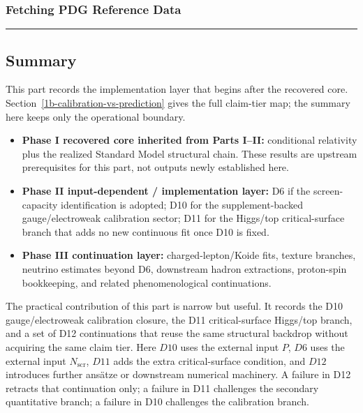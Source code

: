 \subsubsection{Fetching PDG Reference Data}\label{125-fetching-pdg-reference-data}

\begin{Shaded}
\begin{Highlighting}[]
\end{Highlighting}
\end{Shaded}

\begin{center}\rule{0.5\linewidth}{0.5pt}\end{center}

\subsection{Summary}\label{summary}

This part records the implementation layer that begins after the recovered core. Section~\ref{1b-calibration-vs-prediction} gives the full claim-tier map; the summary here keeps only the operational boundary.

\begin{itemize}
\item \textbf{Phase I recovered core inherited from Parts I--II:} conditional relativity plus the realized Standard Model structural chain. These results are upstream prerequisites for this part, not outputs newly established here.
\item \textbf{Phase II input-dependent / implementation layer:} D6 if the screen-capacity identification is adopted; D10 for the supplement-backed gauge/electroweak calibration sector; D11 for the Higgs/top critical-surface branch that adds no new continuous fit once D10 is fixed.
\item \textbf{Phase III continuation layer:} charged-lepton/Koide fits, texture branches, neutrino estimates beyond D6, downstream hadron extractions, proton-spin bookkeeping, and related phenomenological continuations.
\end{itemize}

The practical contribution of this part is narrow but useful. It records the D10 gauge/electroweak calibration closure, the D11 critical-surface Higgs/top branch, and a set of D12 continuations that reuse the same structural backdrop without acquiring the same claim tier. Here \(D10\) uses the external input \(P\), \(D6\) uses the external input \(N_{\mathrm{scr}}\), \(D11\) adds the extra critical-surface condition, and \(D12\) introduces further ans\"atze or downstream numerical machinery. A failure in D12 retracts that continuation only; a failure in D11 challenges the secondary quantitative branch; a failure in D10 challenges the calibration branch.
